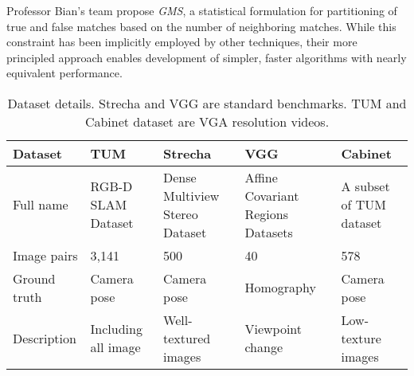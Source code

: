 \documentclass[twocolumn]{article}
\begin{document}
	Professor Bian's team propose \emph{GMS}, a statistical formulation for partitioning of true and false matches based on the number of neighboring matches. While this constraint has been implicitly employed by other techniques, their more principled approach enables development of simpler, faster algorithms with nearly equivalent performance.

	\begin{table}[htbp]
	\centering
	\caption{Dataset details. Strecha and VGG are standard benchmarks. TUM and Cabinet dataset are VGA resolution videos.} \label{1}
	\begin{tabular}{|p{1.5cm}|p{1cm}|p{1.5cm}|p{2cm}|p{1.5cm}|}
		\hline
		Dataset & TUM & Strecha & VGG & Cabinet\\
		\hline
		Full name & RGB-D SLAM Dataset& Dense Multiview
		Stereo Dataset & Affine Covariant Regions Datasets & A subset of
		TUM dataset\\
		\hline
		Image pairs & 3,141 & 500 & 40 &578\\
		\hline
		Ground truth & Camera pose& Camera pose& Homography & Camera pose\\
		\hline
		Description &Including all image&Well-textured images & Viewpoint change& Low-texture images \\
		\hline  
	\end{tabular}
\end{table}



	
\end{document}
